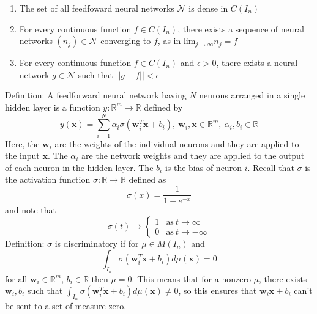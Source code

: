\documentclass[12 pt]{article}
\theoremstyle{definition}
\newcommand{\R}{\mathbb{R}}
\begin{document}
\begin{enumerate}
\item The set of all feedfoward neural networks $\mathcal{N}$ is dense in $C(I_{n})$ 
\item For every continuous function $f \in C(I_{n})$, there exists a sequence of neural networks $(n_{j}) \in \mathcal{N}$ converging to $f$, as in $\text{lim}_{j \rightarrow \infty} n_{j} = f$ 
\item For every continuous function $f \in C(I_{n})$ and $\epsilon > 0$, there exists a neural network $g \in \mathcal{N}$ such that $|| g - f || < \epsilon$
\end{enumerate}
Definition: A feedforward neural network having $N$ neurons arranged in a single hidden layer is a function $y: \R^{m} \rightarrow \R$ defined by 
\begin{equation*}
y(\textbf{x}) = \sum_{i = 1}^{N} \alpha_{i} \sigma(\textbf{w}^{T}_{i} \textbf{x} + b_{i}), \  \textbf{w}_{i}, \textbf{x} \in \R^{m}, \ \alpha_{i}, b_{i} \in \R
\end{equation*}
Here, the $\textbf{w}_{i}$ are the weights of the individual neurons and they are applied to the input $\textbf{x}$. The $\alpha_{i}$ are the network weights and they are applied to the output of each neuron in the hidden layer. The $b_{i}$ is the bias of neuron $i$. Recall that $\sigma$ is the activation function $\sigma: \R \rightarrow \R$ defined as 
\begin{equation*}
\sigma(x) = \frac{1}{1 + e^{-x}}
\end{equation*}
and note that 
\begin{equation*}
\sigma(t) \rightarrow \begin{cases} 1 & \text{as} \ t \rightarrow \infty \\
0 & \text{as} \ t \rightarrow -\infty
\end{cases}
\end{equation*}
Definition: $\sigma$ is discriminatory if for $\mu \in M(I_{n})$ and 
\begin{equation*}
\int_{I_{n}} \sigma( \textbf{w}^{T}_{i} \textbf{x} + b_{i}) d \mu( \textbf{x}) = 0 
\end{equation*}
for all $\textbf{w}_{i} \in \R^{m}$, $b_{i} \in \R$ then $\mu = 0$. This means that for a nonzero $\mu$, there exists $\textbf{w}_{i}, b_{i}$ such that $\int_{I_{n}} \sigma( \textbf{w}^{T}_{i} \textbf{x} + b_{i}) d \mu( \textbf{x}) \neq 0$, so this ensures that $\textbf{w}_{i} \textbf{x} + b_{i}$ can't be sent to a set of measure zero. 
\end{document}
